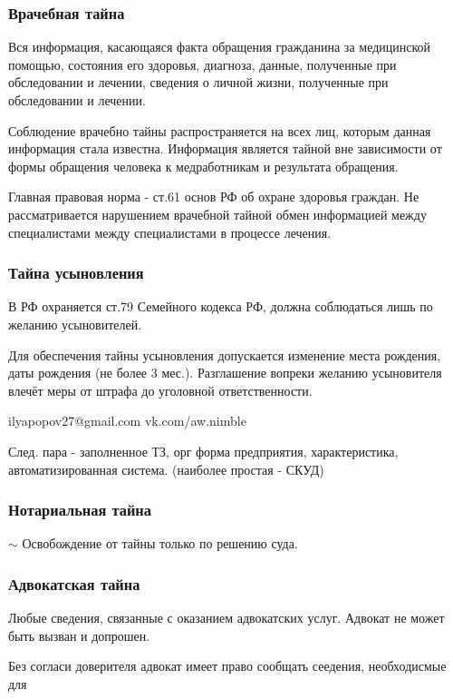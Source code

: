 \documentclass[a4paper,12pt]{report}
\begin{document}
	\subsubsection{Врачебная тайна}
	Вся информация, касающаяся факта обращения гражданина за медицинской помощью, состояния его здоровья, диагноза, данные, полученные при обследовании и лечении, сведения о личной жизни, полученные при обследовании и лечении.

	Соблюдение врачебно тайны распространяется на всех лиц, которым данная информация стала известна. Информация является тайной вне зависимости от формы обращения человека к медработникам и результата обращения.

	Главная правовая норма - ст.61 основ РФ об охране здоровья граждан. Не рассматривается нарушением врачебной тайной обмен информацией между специалистами между специалистами в процессе лечения.


	\subsubsection{Тайна усыновления}
	В РФ охраняется ст.79 Семейного кодекса РФ, должна соблюдаться лишь по желанию усыновителей.

	Для обеспечения тайны усыновления допускается изменение места рождения, даты рождения (не более 3 мес.). Разглашение вопреки желанию усыновителя влечёт меры от штрафа до уголовной ответственности.

	ilyapopov27@gmail.com
	vk.com/aw.nimble


	След. пара - заполненное ТЗ, орг форма предприятия, характеристика, автоматизированная система. (наиболее простая - СКУД)




	\subsubsection{Нотариальная тайна}

	$\sim$
	Освобождение от тайны только по решению суда.


	\subsubsection{Адвокатская тайна}
	Любые сведения, связанные с оказанием адвокатских услуг. Адвокат не может быть вызван и допрошен.

	Без согласи доверителя адвокат имеет право сообщать сеедения, необходисмые для
\end{document}
